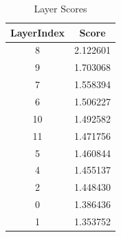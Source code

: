 
\begin{table}[h]
\centering
\begin{tabular}{|c|c|}
\hline
LayerIndex & Score \\
\hline
8 & 2.122601 \\
\hline
9 & 1.703068 \\
\hline
7 & 1.558394 \\
\hline
6 & 1.506227 \\
\hline
10 & 1.492582 \\
\hline
11 & 1.471756 \\
\hline
5 & 1.460844 \\
\hline
4 & 1.455137 \\
\hline
2 & 1.448430 \\
\hline
0 & 1.386436 \\
\hline
1 & 1.353752 \\
\hline
\end{tabular}
\caption{Layer Scores}
\end{table}

